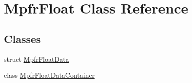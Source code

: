 \hypertarget{class_mpfr_float}{}\section{Mpfr\+Float Class Reference}
\label{class_mpfr_float}
\subsection*{Classes}
\begin{DoxyCompactItemize}
\item 
struct \hyperlink{struct_mpfr_float_1_1_mpfr_float_data}{Mpfr\+Float\+Data}
\item 
class \hyperlink{class_mpfr_float_1_1_mpfr_float_data_container}{Mpfr\+Float\+Data\+Container}
\end{DoxyCompactItemize}
